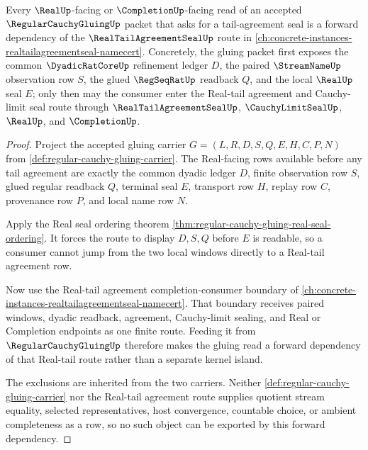 \begin{theorem}
\label{thm:regular-cauchy-gluing-real-tail-forward-route}
Every $\RealUp$-facing or $\CompletionUp$-facing read of an accepted $\RegularCauchyGluingUp$ packet that asks for a tail-agreement seal is a forward dependency of the $\RealTailAgreementSealUp$ route in \autoref{ch:concrete-instances-realtailagreementseal-namecert}. Concretely, the gluing packet first exposes the common $\DyadicRatCoreUp$ refinement ledger $D$, the paired $\StreamNameUp$ observation row $S$, the glued $\RegSeqRatUp$ readback $Q$, and the local $\RealUp$ seal $E$; only then may the consumer enter the Real-tail agreement and Cauchy-limit seal route through $\RealTailAgreementSealUp$, $\CauchyLimitSealUp$, $\RealUp$, and $\CompletionUp$.
\end{theorem}
\begin{proof}
Project the accepted gluing carrier $G=(L,R,D,S,Q,E,H,C,P,N)$ from \autoref{def:regular-cauchy-gluing-carrier}. The Real-facing rows available before any tail agreement are exactly the common dyadic ledger $D$, finite observation row $S$, glued regular readback $Q$, terminal seal $E$, transport row $H$, replay row $C$, provenance row $P$, and local name row $N$.

Apply the Real seal ordering theorem \autoref{thm:regular-cauchy-gluing-real-seal-ordering}. It forces the route to display $D,S,Q$ before $E$ is readable, so a consumer cannot jump from the two local windows directly to a Real-tail agreement row.

Now use the Real-tail agreement completion-consumer boundary of \autoref{ch:concrete-instances-realtailagreementseal-namecert}. That boundary receives paired windows, dyadic readback, agreement, Cauchy-limit sealing, and Real or Completion endpoints as one finite route. Feeding it from $\RegularCauchyGluingUp$ therefore makes the gluing read a forward dependency of that Real-tail route rather than a separate kernel island.

The exclusions are inherited from the two carriers. Neither \autoref{def:regular-cauchy-gluing-carrier} nor the Real-tail agreement route supplies quotient stream equality, selected representatives, host convergence, countable choice, or ambient completeness as a row, so no such object can be exported by this forward dependency.
\end{proof}
